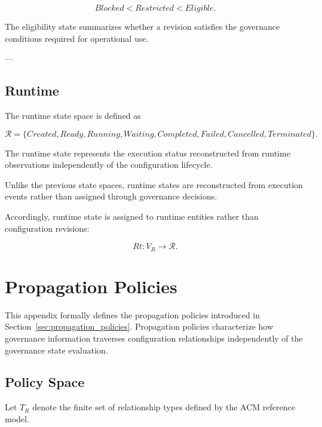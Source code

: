 \documentclass[10pt]{article}
\begin{document}
\begin{equation}
	Blocked
	<
	Restricted
	<
	Eligible.
	\label{eq:eligibility_order}
\end{equation}

The eligibility state summarizes whether a revision satisfies the governance conditions required for operational use.

---

\subsection{Runtime}

The runtime state space is defined as

\begin{equation}
	\mathcal{R}=
	\{
	Created,
	Ready,
	Running,
	Waiting,
	Completed,
	Failed,
	Cancelled,
	Terminated
	\}.
	\label{eq:runtime_space}
\end{equation}

The runtime state represents the execution status reconstructed from runtime observations independently of the configuration lifecycle.

Unlike the previous state spaces, runtime states are reconstructed from execution events rather than assigned through governance decisions.

Accordingly, runtime state is assigned to runtime entities rather than
configuration revisions:

\begin{equation}
	Rt:V_R\rightarrow\mathcal{R}.
	\label{eq:runtime_state_assignment}
\end{equation}

\section{Propagation Policies}
\label{appendix:propagation_policies}

This appendix formally defines the propagation policies introduced in Section~\ref{sec:propagation_policies}. Propagation policies characterize how governance information traverses configuration relationships independently of the governance state evaluation.

\subsection{Policy Space}

Let $T_R$ denote the finite set of relationship types defined by the ACM reference model.
\end{document}
